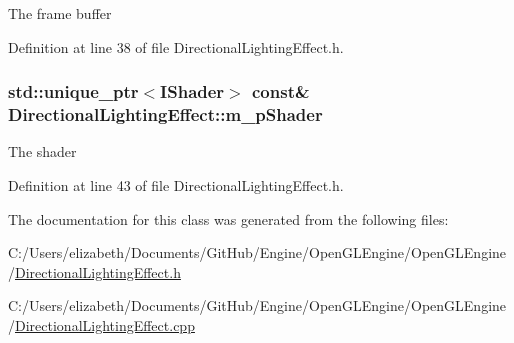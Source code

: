 The frame buffer 



Definition at line 38 of file Directional\+Lighting\+Effect.\+h.

\subsubsection[{\texorpdfstring{m\+\_\+p\+Shader}{m_pShader}}]{\setlength{\rightskip}{0pt plus 5cm}std\+::unique\+\_\+ptr$<${\bf I\+Shader}$>$ const\& Directional\+Lighting\+Effect\+::m\+\_\+p\+Shader\hspace{0.3cm}{\ttfamily [private]}}\hypertarget{class_directional_lighting_effect_ad53c001d1de64b1b539b68d5de943c4f}{}\label{class_directional_lighting_effect_ad53c001d1de64b1b539b68d5de943c4f}


The shader 



Definition at line 43 of file Directional\+Lighting\+Effect.\+h.



The documentation for this class was generated from the following files\+:\begin{DoxyCompactItemize}
\item 
C\+:/\+Users/elizabeth/\+Documents/\+Git\+Hub/\+Engine/\+Open\+G\+L\+Engine/\+Open\+G\+L\+Engine/\hyperlink{_directional_lighting_effect_8h}{Directional\+Lighting\+Effect.\+h}\item 
C\+:/\+Users/elizabeth/\+Documents/\+Git\+Hub/\+Engine/\+Open\+G\+L\+Engine/\+Open\+G\+L\+Engine/\hyperlink{_directional_lighting_effect_8cpp}{Directional\+Lighting\+Effect.\+cpp}\end{DoxyCompactItemize}
